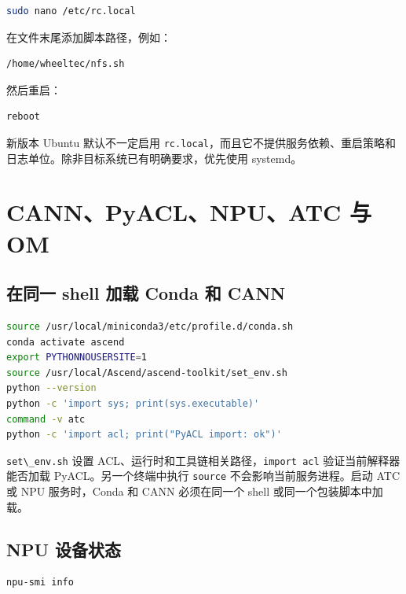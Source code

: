 \begin{lstlisting}[language=bash]
sudo nano /etc/rc.local
\end{lstlisting}

在文件末尾添加脚本路径，例如：

\begin{lstlisting}
/home/wheeltec/nfs.sh
\end{lstlisting}

然后重启：

\begin{lstlisting}[language=bash]
reboot
\end{lstlisting}

新版本 Ubuntu 默认不一定启用
\passthrough{\lstinline!rc.local!}，而且它不提供服务依赖、重启策略和日志单位。除非目标系统已有明确要求，优先使用
systemd。

\section{CANN、PyACL、NPU、ATC 与 OM}\label{cannpyaclnpuatc-ux4e0e-om}

\subsection{在同一 shell 加载 Conda 和
CANN}\label{ux5728ux540cux4e00-shell-ux52a0ux8f7d-conda-ux548c-cann}

\begin{lstlisting}[language=bash]
source /usr/local/miniconda3/etc/profile.d/conda.sh
conda activate ascend
export PYTHONNOUSERSITE=1
source /usr/local/Ascend/ascend-toolkit/set_env.sh
python --version
python -c 'import sys; print(sys.executable)'
command -v atc
python -c 'import acl; print("PyACL import: ok")'
\end{lstlisting}

\passthrough{\lstinline!set\_env.sh!} 设置
ACL、运行时和工具链相关路径，\passthrough{\lstinline!import acl!}
验证当前解释器能否加载 PyACL。另一个终端中执行
\passthrough{\lstinline!source!} 不会影响当前服务进程。启动 ATC 或 NPU
服务时，Conda 和 CANN 必须在同一个 shell 或同一个包装脚本中加载。

\subsection{NPU 设备状态}\label{npu-ux8bbeux5907ux72b6ux6001}

\begin{lstlisting}[language=bash]
npu-smi info
\end{lstlisting}

